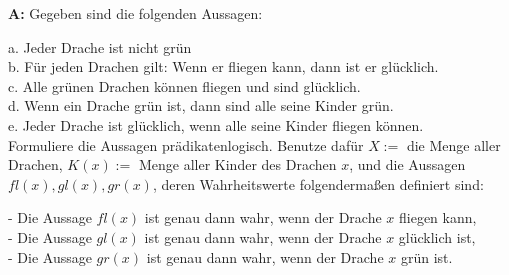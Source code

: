 \documentclass[landscape,twocolumn,a4paper]{article}
\begin{document}
\textbf{A:}
Gegeben sind die folgenden Aussagen:

a. Jeder Drache ist nicht grün \\
b. Für jeden Drachen gilt: Wenn er fliegen kann, dann ist er glücklich. \\
c. Alle grünen Drachen können fliegen und sind glücklich. \\
d. Wenn ein Drache grün ist, dann sind alle seine Kinder grün. \\
e. Jeder Drache ist glücklich, wenn alle seine Kinder fliegen können. \\

Formuliere die Aussagen prädikatenlogisch. Benutze dafür $X:=$ die Menge aller Drachen, $K(x):=$ Menge aller 
Kinder des Drachen $x$, und die Aussagen $fl(x), gl(x), gr(x)$, deren Wahrheitswerte folgendermaßen definiert sind:

- Die Aussage $fl(x)$ ist genau dann wahr, wenn der Drache $x$ fliegen kann, \\
- Die Aussage $gl(x)$ ist genau dann wahr, wenn der Drache $x$ glücklich ist, \\
- Die Aussage $gr(x)$ ist genau dann wahr, wenn der Drache $x$ grün ist.
\bigskip {}
\end{document}
